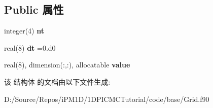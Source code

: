 \subsection*{Public 属性}
\begin{DoxyCompactItemize}
\item 
\mbox{\label{structmodulegrid0d1t_1_1grid0d1t_a32c8ee68c5791c31eb190c1f9271894b}} 
integer(4) {\bfseries nt}
\item 
\mbox{\label{structmodulegrid0d1t_1_1grid0d1t_a759f2b5a1e7a920ce510c198c88f848e}} 
real(8) {\bfseries dt} =0.d0
\item 
\mbox{\label{structmodulegrid0d1t_1_1grid0d1t_aacbe7fc91ac60a2a353488ad4fea1982}} 
real(8), dimension(\+:,\+:), allocatable {\bfseries value}
\end{DoxyCompactItemize}


该 结构体 的文档由以下文件生成\+:\begin{DoxyCompactItemize}
\item 
D\+:/\+Source/\+Repos/i\+P\+M1\+D/1\+D\+P\+I\+C\+M\+C\+Tutorial/code/base/Grid.\+f90\end{DoxyCompactItemize}
